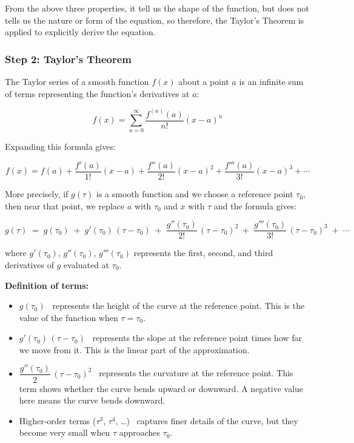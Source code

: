 \documentclass[12pt,a4paper]{report}
\theoremstyle{definition}
\theoremstyle{plain}
\theoremstyle{remark}
\begin{document}
	From the above three properties, it tell us the shape of the function, but does not tells us the nature or form of the equation, so therefore, the Taylor's Theorem is applied  to explicitly derive the equation.
	
	\subsubsection*{Step 2: Taylor's Theorem}
	
	
	The Taylor series of a smooth function $f(x)$ about a point 
	$a$ is an infinite sum of terms representing the function's 
	derivatives at $a$:
	
	\begin{equation}
		f(x) = \sum_{n=0}^{\infty} \frac{f^{(n)}(a)}{n!}(x - a)^n
	\end{equation}
	
	Expanding this formula gives:
	
	\begin{equation}
		f(x) = f(a) + \frac{f'(a)}{1!}(x - a) 
		+ \frac{f''(a)}{2!}(x - a)^2 
		+ \frac{f'''(a)}{3!}(x - a)^3 
		+ \cdots
	\end{equation}
	
	More precisely, if $g(\tau)$ is a smooth function and we choose a reference
	point $\tau_0$, then near that point, we replace $a$ with $\tau_0$ and $x$ with $\tau$ and the formula gives:
	
	\begin{equation}
		g(\tau) \;=\; g(\tau_0)
		\;+\; g'(\tau_0)\,(\tau - \tau_0)
		\;+\; \frac{g''(\tau_0)}{2!}\,(\tau-\tau_0)^2
		\;+\; \frac{g'''(\tau_0)}{3!}\,(\tau-\tau_0)^3
		\;+\; \cdots
		\label{eq:taylor_full}
	\end{equation}
	
	where $g'(\tau_0)$, $g''(\tau_0)$, $g'''(\tau_0)$ represents the first, second, and
	third derivatives of $g$ evaluated at $\tau_0$.
	
	\medskip
	\noindent
	\textbf{Definition of terms:}
	
	\begin{itemize}
		\item $g(\tau_0)$ \ represents the height of the curve at the reference point.
		This is the value of the function when $\tau = \tau_0$.
		
		\item $g'(\tau_0)\,(\tau-\tau_0)$ \ represents the slope at the reference point
		times how far we move from it. This is the linear part of the approximation.
		
		\item $\dfrac{g''(\tau_0)}{2}\,(\tau-\tau_0)^2$ \ represents the curvature at the reference point. This term shows whether the curve bends upward
		or downward. A negative value here means the curve bends downward.
		
		\item Higher-order terms ($\tau^3$, $\tau^4$, \ldots) \ captures finer
		details of the curve, but they become very small when $\tau$ approaches
		$\tau_0$. 
	\end{itemize}
	
\end{document}
